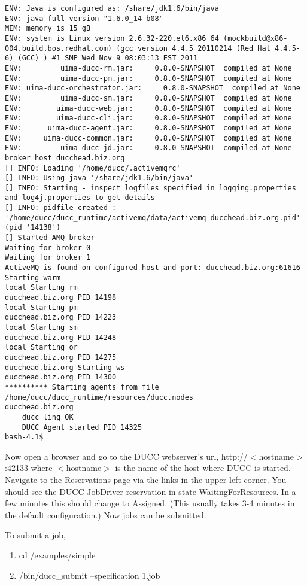 \begin{verbatim}
ENV: Java is configured as: /share/jdk1.6/bin/java
ENV: java full version "1.6.0_14-b08"
MEM: memory is 15 gB
ENV: system is Linux version 2.6.32-220.el6.x86_64 (mockbuild@x86-004.build.bos.redhat.com) (gcc version 4.4.5 20110214 (Red Hat 4.4.5-6) (GCC) ) #1 SMP Wed Nov 9 08:03:13 EST 2011
ENV:         uima-ducc-rm.jar:     0.8.0-SNAPSHOT  compiled at None
ENV:         uima-ducc-pm.jar:     0.8.0-SNAPSHOT  compiled at None
ENV: uima-ducc-orchestrator.jar:     0.8.0-SNAPSHOT  compiled at None
ENV:         uima-ducc-sm.jar:     0.8.0-SNAPSHOT  compiled at None
ENV:        uima-ducc-web.jar:     0.8.0-SNAPSHOT  compiled at None
ENV:        uima-ducc-cli.jar:     0.8.0-SNAPSHOT  compiled at None
ENV:      uima-ducc-agent.jar:     0.8.0-SNAPSHOT  compiled at None
ENV:     uima-ducc-common.jar:     0.8.0-SNAPSHOT  compiled at None
ENV:         uima-ducc-jd.jar:     0.8.0-SNAPSHOT  compiled at None
broker host ducchead.biz.org
[] INFO: Loading '/home/ducc/.activemqrc'
[] INFO: Using java '/share/jdk1.6/bin/java'
[] INFO: Starting - inspect logfiles specified in logging.properties and log4j.properties to get details
[] INFO: pidfile created : '/home/ducc/ducc_runtime/activemq/data/activemq-ducchead.biz.org.pid' (pid '14138')
[] Started AMQ broker
Waiting for broker 0
Waiting for broker 1
ActiveMQ is found on configured host and port: ducchead.biz.org:61616
Starting warm
local Starting rm
ducchead.biz.org PID 14198
local Starting pm
ducchead.biz.org PID 14223
local Starting sm
ducchead.biz.org PID 14248
local Starting or
ducchead.biz.org PID 14275
ducchead.biz.org Starting ws
ducchead.biz.org PID 14300
********** Starting agents from file /home/ducc/ducc_runtime/resources/ducc.nodes
ducchead.biz.org
    ducc_ling OK
    DUCC Agent started PID 14325
bash-4.1$
\end{verbatim}

  Now open a browser and go to the DUCC webserver's url, http://$<$hostname$>$:42133 where $<$hostname$>$ is
  the name of the host where DUCC is started.  Navigate to the Reservations page via the links in
  the upper-left corner.  You should see the DUCC JobDriver reservation in state
  WaitingForResources.  In a few minutes this should change to Assigned.  (This usually takes 3-4
  minutes in the default configuration.) Now jobs can be submitted.

  To submit a job,
  \begin{enumerate}
    \item cd \duccruntime/examples/simple
    \item \duccruntime/bin/ducc\_submit --specification 1.job
    \end{enumerate}
    
